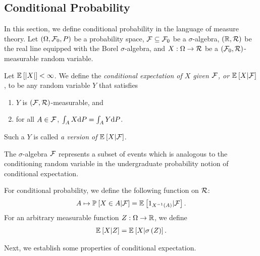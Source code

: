 \subsection{Conditional Probability}
\label{sec:cond_prob}

In this section, we define conditional probability in the language of measure theory. Let $\left(\Omega, \mathcal{F}_0, P\right)$ be a probability space, $\mathcal{F} \subseteq \mathcal{F}_0$ be a $\sigma$-algebra, $\left(\mathbb{R}, \mathcal{R}\right)$ be the real line equipped with the Borel $\sigma$-algebra, and $X: \Omega \rightarrow \mathcal{R}$ be a $\left(\mathcal{F}_0, \mathcal{R}\right)$-measurable random variable.


\begin{defi}
    Let ${\mathbb E}_{}\left[\left|X\right|\right] < \infty$. We define the {\it conditional expectation of $X$ given $\mathcal{F}$, or ${\mathbb E}_{}\left[X | \mathcal{F}\right]$}, to be any random variable $Y$ that satisfies
    \begin{enumerate}[label=(\roman*)]
        \item $Y$ is $\left(\mathcal{F}, \mathcal{R}\right)$-measurable, and
        \item for all $A \in \mathcal{F}$, $\int_A X \text{d} P = \int_A Y \text{d} P$.
    \end{enumerate} 
    Such a $Y$ is called {\it a version of} ${\mathbb E}_{}\left[X | \mathcal{F}\right]$.
\end{defi}

The $\sigma$-algebra $\mathcal{F}$ represents a subset of events which is analogous to the conditioning random variable in the undergraduate probability notion of conditional expectation.

\begin{defi}
    For conditional probability, we define the following function on $\mathcal{R}$:
    \begin{align*}
        A \mapsto {\mathbb P}_{}\left[X \in A|\mathcal{F}\right] = {\mathbb E}_{}\left[1_{X^{-1}\left(A\right)} | \mathcal{F}\right].
    \end{align*}
    For an arbitrary measurable function $Z: \Omega \rightarrow \mathbb{R}$, we define
    \begin{align*}
        {\mathbb E}_{}\left[X | Z\right] = {\mathbb E}_{}\left[X | \sigma\left(Z\right)\right].
    \end{align*}
\end{defi}

Next, we establish some properties of conditional expectation.

